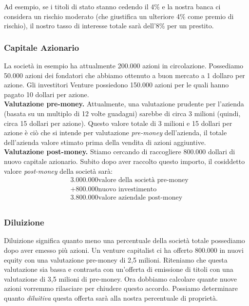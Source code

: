 \documentclass[a4paper,portrait,12pt]{article}
\theoremstyle{definition}
\begin{document}
Ad esempio, se i titoli di stato stanno cedendo il 4\% e la nostra banca ci considera un rischio moderato (che giustifica un ulteriore 4\% come premio di rischio), il nostro tasso di interesse totale sarà dell'8\% per un prestito.

\subsubsection{Capitale Azionario}

La società in esempio ha attualmente 200.000 azioni in circolazione.
Possediamo 50.000 azioni dei fondatori che abbiamo ottenuto a buon mercato a 1 dollaro per azione.
Gli investitori Venture possiedono 150.000 azioni per le quali hanno pagato 10 dollari per azione.\\

\textbf{Valutazione pre-money.}
Attualmente, una valutazione prudente per l'azienda (basata su un multiplo di 12 volte guadagni) sarebbe di circa 3 milioni (quindi, circa 15 dollari per azione).
Questo valore totale di 3 milioni e 15 dollari per azione è ciò che si intende per valutazione \emph{pre-money} dell'azienda, il totale dell'azienda valore stimato prima della vendita di azioni aggiuntive.\\

\textbf{Valutazione post-money.}
Stiamo cercando di raccogliere 800.000 dollari di nuovo capitale azionario.
Subito dopo aver raccolto questo importo, il cosiddetto valore \emph{post-money} della società sarà:
\begin{align*}
&3.000.000 \text{valore della società pre-money}\\
&+ 800.000 \text{nuovo investimento}\\
&3.800.000 \text{valore aziendale post-money}\\
\end{align*}


\subsubsection{Diluizione}
Diluizione significa quanto meno una percentuale della società totale possediamo dopo aver emesso più azioni.
Un venture capitalist ci ha offerto 800.000 in nuovi equity con una valutazione pre-money di 2,5 milioni.
Riteniamo che questa valutazione sia bassa e contrasta con un'offerta di emissione di titoli con una valutazione di 3,5 milioni di pre-money.
Ora dobbiamo calcolare quante nuove azioni vorremmo rilasciare per chiudere questo accordo.
Possiamo determinare quanto \emph{diluitiva} questa offerta sarà alla nostra percentuale di proprietà.\\
\end{document}
